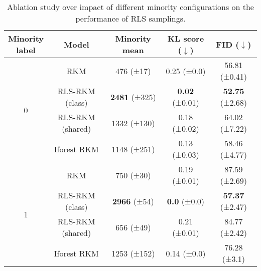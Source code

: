 \begin{table}[ht]
    \centering
    \begin{tabular}{ccccc}
\toprule
\makecell{Minority \\ label} & Model & Minority mean & KL score ($\downarrow$) & FID ($\downarrow$) \\
\midrule
\multirow{4}{*}{0} &  RKM & 476 (±17) & 0.25 (±0.0) & 56.81 (±0.41) \\
  &  RLS-RKM (class) &      \textbf{2481} (±325) &  \textbf{0.02} (±0.01) & \textbf{52.75} (±2.68) \\
         & RLS-RKM (shared) &      1332 (±130) &  0.18 (±0.02) & 64.02 (±7.22) \\
     & Iforest RKM &      1148 (±251) &  0.13 (±0.03) & 58.46 (±4.77) \\
\midrule
 \multirow{4}{*}{1}    &              RKM &        750 (±30) &  0.19 (±0.01) & 87.59 (±2.69) \\
     &  RLS-RKM (class) &       \textbf{2966} (±54) &    \textbf{0.0} (±0.0) & \textbf{57.37} (±2.47) \\
     & RLS-RKM (shared) &        656 (±49) &  0.21 (±0.01) & 84.77 (±2.42) \\
     & Iforest RKM &      1253 (±152) &   0.14 (±0.0) &  76.28 (±3.1) \\
\bottomrule
\end{tabular}
    \caption{Ablation study over impact of different minority configurations on the performance of RLS samplings.}
    \label{tab-expr-different_minorities}
\end{table}
